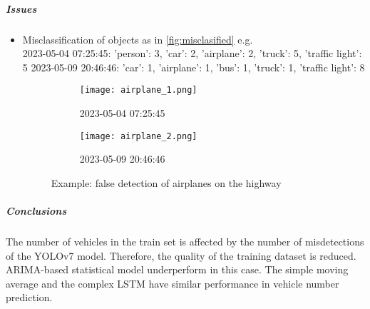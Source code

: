 \documentclass{intcov_report}
\begin{document}
\subparagraph{Issues}
\begin{itemize}
\item Misclassification of objects as in \autoref{fig:misclasified} e.g. \\

2023-05-04 07:25:45: {'person': 3, 'car': 2, 'airplane': 2, 'truck': 5, 'traffic light': 5}
2023-05-09 20:46:46: {'car': 1, 'airplane': 1, 'bus': 1, 'truck': 1, 'traffic light': 8}


\begin{figure}[H]
     \centering
     \begin{subfigure}[b]{0.45\textwidth}
         \centering
         \texttt{[image: airplane\_1.png]}
         \caption{2023-05-04 07:25:45}
     \end{subfigure}
     \hfill
     \begin{subfigure}[b]{0.45\textwidth}
         \centering
         \texttt{[image: airplane\_2.png]}
         \caption{2023-05-09 20:46:46}
     \end{subfigure}
     \caption{Example: false detection of airplanes on the highway}
        \label{fig:misclasified}
\end{figure}

\end{itemize}

\subparagraph{Conclusions\\}
The number of vehicles in the train set is affected by the number of misdetections of the YOLOv7 model. Therefore, the quality of the training dataset is reduced. ARIMA-based statistical model underperform in this case. The simple moving average and the complex LSTM have similar performance in vehicle number prediction.
\end{document}
